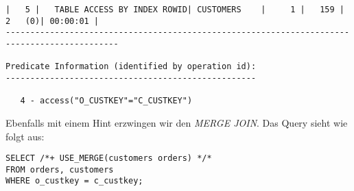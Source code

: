 \documentclass[11pt,a4paper,parskip=half]{scrartcl}
\begin{document}
\begin{lstlisting}
|   5 |   TABLE ACCESS BY INDEX ROWID| CUSTOMERS    |     1 |   159 |     2   (0)| 00:00:01 |                                                                                                                                                                                                                
---------------------------------------------------------------------------------------------                                                                                                                                                                                                                
                                                                                                                                                                                                                                                                                                             
Predicate Information (identified by operation id):                                                                                                                                                                                                                                                          
---------------------------------------------------                                                                                                                                                                                                                                                          
                                                                                                                                                                                                                                                                                                             
   4 - access("O_CUSTKEY"="C_CUSTKEY")                                                                                                                                                                                                                                                                       
\end{lstlisting}

Ebenfalls mit einem Hint erzwingen wir den \emph{MERGE JOIN}. Das Query sieht wie folgt aus:
\begin{lstlisting}
SELECT /*+ USE_MERGE(customers orders) */*
FROM orders, customers
WHERE o_custkey = c_custkey;
\end{lstlisting}
\end{document}
